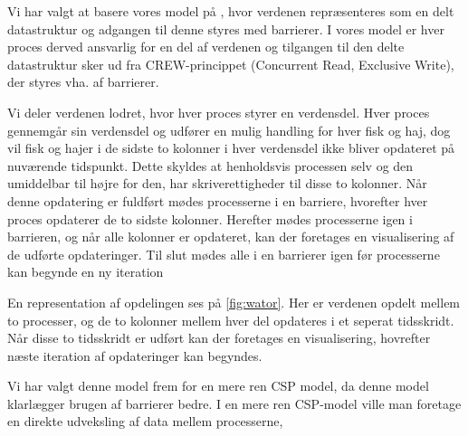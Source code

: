 Vi har valgt at basere vores model på \cite{crew}, hvor verdenen repræsenteres 
som en delt datastruktur og adgangen til denne styres med barrierer. I vores 
model er hver proces derved ansvarlig for en del af verdenen og tilgangen til 
den delte datastruktur sker ud fra CREW-princippet (Concurrent Read, Exclusive 
Write)\cite[5]{crew}, der styres vha. af barrierer. 

Vi deler verdenen lodret, hvor hver proces styrer en verdensdel. Hver proces 
gennemgår sin verdensdel og udfører en mulig handling for hver fisk og haj, dog 
vil fisk og hajer i de sidste to kolonner i hver verdensdel ikke bliver 
opdateret på nuværende tidspunkt. Dette skyldes at henholdsvis processen selv 
og den umiddelbar til højre for den, har skriverettigheder til disse to 
kolonner.
Når denne opdatering er fuldført mødes processerne i en barriere, hvorefter 
hver proces opdaterer de to sidste kolonner. Herefter mødes processerne igen i 
barrieren, og når alle kolonner er opdateret, kan der foretages en 
visualisering af de udførte opdateringer. Til slut mødes alle i en barrierer igen før processerne kan begynde en ny iteration 

En representation af opdelingen ses på \autoref{fig:wator}. Her er verdenen 
opdelt mellem to processer, og de to kolonner mellem hver del opdateres i et 
seperat tidsskridt. Når disse to tidsskridt er udført kan der foretages en 
visualisering, hovrefter næste iteration af opdateringer kan begyndes.  

Vi har valgt denne model frem for en mere ren CSP model, da denne model 
klarlægger brugen af barrierer bedre. I en mere ren CSP-model ville man 
foretage en direkte udveksling af data mellem 
processerne, 


